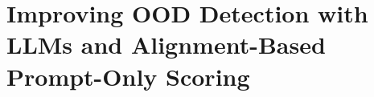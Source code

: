 \chapter{Improving OOD Detection with LLMs and Alignment-Based Prompt-Only Scoring}
\label{diss_atpo}




